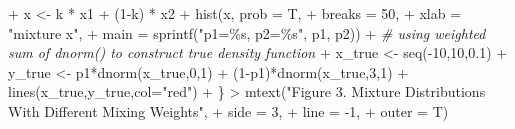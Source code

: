 \documentclass[
]{article}
\newenvironment{Shaded}{\begin{snugshade}}{\end{snugshade}}
\newcommand{\AttributeTok}[1]{\textcolor[rgb]{0.77,0.63,0.00}{#1}}
\newcommand{\CommentTok}[1]{\textcolor[rgb]{0.56,0.35,0.01}{\textit{#1}}}
\newcommand{\DecValTok}[1]{\textcolor[rgb]{0.00,0.00,0.81}{#1}}
\newcommand{\FloatTok}[1]{\textcolor[rgb]{0.00,0.00,0.81}{#1}}
\newcommand{\FunctionTok}[1]{\textcolor[rgb]{0.00,0.00,0.00}{#1}}
\newcommand{\NormalTok}[1]{#1}
\newcommand{\OtherTok}[1]{\textcolor[rgb]{0.56,0.35,0.01}{#1}}
\newcommand{\SpecialCharTok}[1]{\textcolor[rgb]{0.00,0.00,0.00}{#1}}
\newcommand{\StringTok}[1]{\textcolor[rgb]{0.31,0.60,0.02}{#1}}
\begin{document}
\begin{Shaded}
\begin{Highlighting}[]
\SpecialCharTok{+}\NormalTok{   x }\OtherTok{\textless{}{-}}\NormalTok{ k }\SpecialCharTok{*}\NormalTok{ x1 }\SpecialCharTok{+}\NormalTok{ (}\DecValTok{1}\SpecialCharTok{{-}}\NormalTok{k) }\SpecialCharTok{*}\NormalTok{ x2}
\SpecialCharTok{+}   \FunctionTok{hist}\NormalTok{(x, }\AttributeTok{prob =}\NormalTok{ T, }
\SpecialCharTok{+}        \AttributeTok{breaks =} \DecValTok{50}\NormalTok{, }
\SpecialCharTok{+}        \AttributeTok{xlab =} \StringTok{"mixture x"}\NormalTok{,}
\SpecialCharTok{+}        \AttributeTok{main =} \FunctionTok{sprintf}\NormalTok{(}\StringTok{"p1=\%s, p2=\%s"}\NormalTok{, p1, p2))}
\SpecialCharTok{+}   \CommentTok{\# using weighted sum of dnorm() to construct true density function}
\SpecialCharTok{+}\NormalTok{   x\_true }\OtherTok{\textless{}{-}} \FunctionTok{seq}\NormalTok{(}\SpecialCharTok{{-}}\DecValTok{10}\NormalTok{,}\DecValTok{10}\NormalTok{,}\FloatTok{0.1}\NormalTok{)}
\SpecialCharTok{+}\NormalTok{   y\_true }\OtherTok{\textless{}{-}}\NormalTok{ p1}\SpecialCharTok{*}\FunctionTok{dnorm}\NormalTok{(x\_true,}\DecValTok{0}\NormalTok{,}\DecValTok{1}\NormalTok{) }\SpecialCharTok{+}\NormalTok{ (}\DecValTok{1}\SpecialCharTok{{-}}\NormalTok{p1)}\SpecialCharTok{*}\FunctionTok{dnorm}\NormalTok{(x\_true,}\DecValTok{3}\NormalTok{,}\DecValTok{1}\NormalTok{)}
\SpecialCharTok{+}   \FunctionTok{lines}\NormalTok{(x\_true,y\_true,}\AttributeTok{col=}\StringTok{"red"}\NormalTok{)}
\SpecialCharTok{+}\NormalTok{ \}}
\SpecialCharTok{\textgreater{}} \FunctionTok{mtext}\NormalTok{(}\StringTok{"Figure 3. Mixture Distributions With Different Mixing Weights"}\NormalTok{,}
\SpecialCharTok{+}       \AttributeTok{side =} \DecValTok{3}\NormalTok{,}
\SpecialCharTok{+}       \AttributeTok{line =} \SpecialCharTok{{-}}\DecValTok{1}\NormalTok{,}
\SpecialCharTok{+}       \AttributeTok{outer =}\NormalTok{ T)}
\end{Highlighting}
\end{Shaded}
\end{document}
